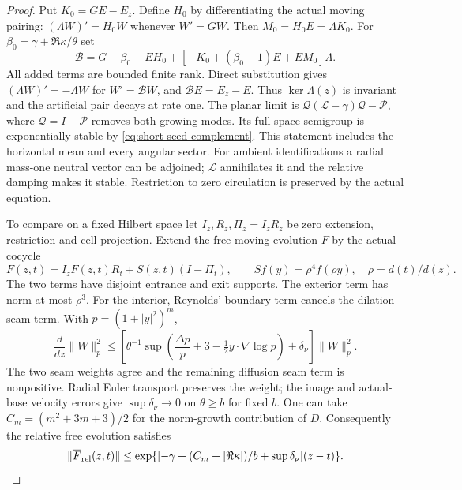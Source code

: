 \begin{proof}
Put $K_0=GE-E_z$. Define $H_0$ by differentiating the actual moving
pairing: $(\Lambda W)'=H_0W$ whenever $W'=GW$. Then
$M_0=H_0E=\Lambda K_0$. For $\beta_0=\gamma+\Re\kappa/\theta$ set
\begin{equation}\label{eq:short-causal-damped-complement}
 \mathcal B=G-\beta_0-EH_0+
       [-K_0+(\beta_0-1)E+EM_0]\Lambda.
\end{equation}
All added terms are bounded finite rank. Direct substitution gives
$(\Lambda W)'=-\Lambda W$ for $W'=\mathcal BW$, and
$\mathcal BE=E_z-E$. Thus $\ker\Lambda(z)$ is invariant and the
artificial pair decays at rate one. The planar limit is
$\mathscr Q(\mathscr L-\gamma)\mathscr Q-\mathscr P$, where
$\mathscr Q=I-\mathscr P$ removes both growing modes. Its full-space
semigroup is
exponentially stable by \eqref{eq:short-seed-complement}.
This statement includes the horizontal mean and every angular sector.
For ambient identifications a radial mass-one neutral vector can be
adjoined; $\mathscr L$ annihilates it and the relative damping makes
it stable. Restriction to zero circulation is preserved by the actual
equation.

To compare on a fixed Hilbert space let $I_z,R_z,\Pi_z=I_zR_z$ be
zero extension, restriction and cell projection. Extend the free
moving evolution $F$ by the actual cocycle
\[
 \overline F(z,t)=I_zF(z,t)R_t+S(z,t)(I-\Pi_t),\qquad
 Sf(y)=\rho^4f(\rho y),\quad \rho=d(t)/d(z).
\]
The two terms have disjoint entrance and exit supports. The exterior
term has norm at most $\rho^3$. For the interior, Reynolds' boundary
term cancels the dilation seam term. With $p=(1+|y|^2)^m$,
\[
 \frac d{dz}\|W\|_p^2\le
 \left[\theta^{-1}\sup\left(\frac{\Delta p}p+3
                   -\tfrac12y\cdot\nabla\log p\right)+\delta_\nu\right]
                   \|W\|_p^2.
\]
The two seam weights agree and the remaining diffusion seam term is
nonpositive. Radial Euler transport preserves the weight; the image
and actual-base velocity errors give $\sup\delta_\nu\to0$ on
$\theta\ge b$ for fixed $b$. One can take
$C_m=(m^2+3m+3)/2$ for the norm-growth contribution of $D$.
Consequently the relative free evolution satisfies
\begin{equation}\label{eq:short-causal-free-moving}
 \|\overline F_{\rm rel}(z,t)\|
 \le\exp\{[-\gamma+(C_m+|\Re\kappa|)/b+\sup\delta_\nu](z-t)\}.
\end{equation}


\end{proof}
